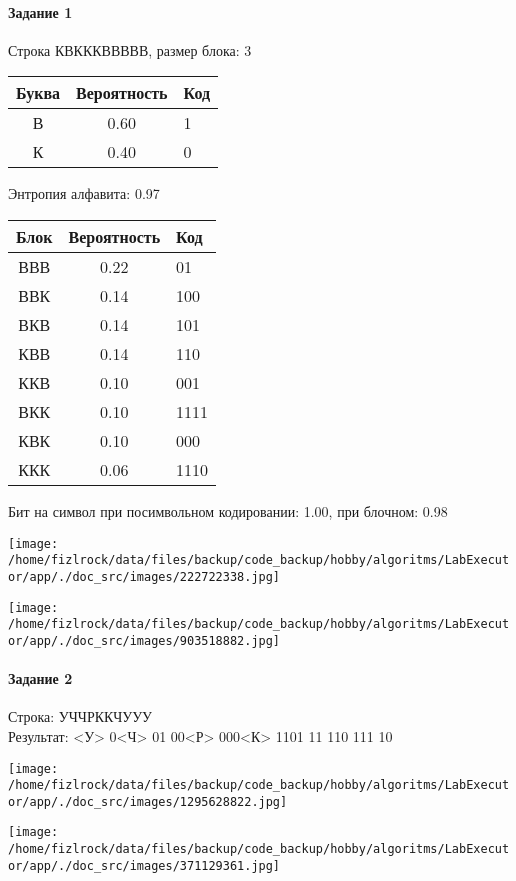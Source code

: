 \documentclass[a4paper, 12pt]{article}
\begin{document}
\paragraph{Задание 1}

Строка КВКККВВВВВ, размер блока: 3
\begin{center}
 \begin{tabular}{ |c|c|l| } 
  \hline
     Буква & Вероятность & Код\\ \hline
В & 0.60 & 1\\\hline
К & 0.40 & 0
\\ \hline \end{tabular}
\end{center}
Энтропия алфавита: 0.97
\begin{center}
 \begin{tabular}{ |c|c|l| } 
  \hline
     Блок & Вероятность & Код\\ \hline
ВВВ & 0.22 & 01\\\hline
ВВК & 0.14 & 100\\\hline
ВКВ & 0.14 & 101\\\hline
КВВ & 0.14 & 110\\\hline
ККВ & 0.10 & 001\\\hline
ВКК & 0.10 & 1111\\\hline
КВК & 0.10 & 000\\\hline
ККК & 0.06 & 1110
\\ \hline \end{tabular}
\end{center}
Бит на символ при посимвольном кодировании: 1.00, при блочном: 0.98

\texttt{[image: /home/fizlrock/data/files/backup/code\_backup/hobby/algoritms/LabExecutor/app/./doc\_src/images/222722338.jpg]}

\texttt{[image: /home/fizlrock/data/files/backup/code\_backup/hobby/algoritms/LabExecutor/app/./doc\_src/images/903518882.jpg]}
\pagebreak
\paragraph{Задание 2}

Строка: 
УЧЧРККЧУУУ\\
Результат: <У> 0<Ч> 01 00<Р> 000<К> 1101 11 110 111 10

\texttt{[image: /home/fizlrock/data/files/backup/code\_backup/hobby/algoritms/LabExecutor/app/./doc\_src/images/1295628822.jpg]}

\texttt{[image: /home/fizlrock/data/files/backup/code\_backup/hobby/algoritms/LabExecutor/app/./doc\_src/images/371129361.jpg]}
\end{document}
